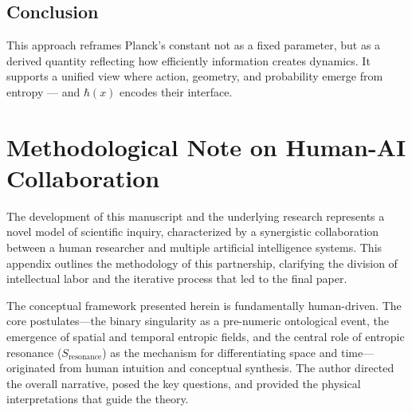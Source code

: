 \documentclass[12pt, a4paper]{article}
\begin{document}
\subsection*{Conclusion}

This approach reframes Planck’s constant not as a fixed parameter, but as a derived quantity reflecting how efficiently information creates dynamics. It supports a unified view where action, geometry, and probability emerge from entropy — and \( \hbar(x) \) encodes their interface.

\section{Methodological Note on Human-AI Collaboration}

The development of this manuscript and the underlying research represents a novel model of scientific inquiry, characterized by a synergistic collaboration between a human researcher and multiple artificial intelligence systems. This appendix outlines the methodology of this partnership, clarifying the division of intellectual labor and the iterative process that led to the final paper.

The conceptual framework presented herein is fundamentally human-driven. The core postulates—the binary singularity as a pre-numeric ontological event, the emergence of spatial and temporal entropic fields, and the central role of entropic resonance (\(S_{\mathrm{resonance}}\)) as the mechanism for differentiating space and time—originated from human intuition and conceptual synthesis. The author directed the overall narrative, posed the key questions, and provided the physical interpretations that guide the theory.
\end{document}
